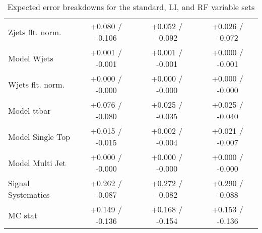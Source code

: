 \begin{enumeate}
\begin{table}[!htbp]
\begin{center}
\begin{tabular}{lccc}
Zjets flt. norm. &  +0.080 / -0.106  &  +0.052 / -0.092  &  +0.026 / -0.072 \\
Model Wjets &  +0.001 / -0.001  &  +0.001 / -0.001  &  +0.000 / -0.001 \\
Wjets flt. norm. &  +0.000 / -0.000  &  +0.000 / -0.000  &  +0.000 / -0.000 \\
Model ttbar &  +0.076 / -0.080  &  +0.025 / -0.035  &  +0.025 / -0.040 \\
Model Single Top &  +0.015 / -0.015  &  +0.002 / -0.004  &  +0.021 / -0.007 \\
Model Multi Jet &  +0.000 / -0.000  &  +0.000 / -0.000  &  +0.000 / -0.000 \\
Signal Systematics &  +0.262 / -0.087  &  +0.272 / -0.082  &  +0.290 / -0.088 \\
MC stat &  +0.149 / -0.136  &  +0.168 / -0.154  &  +0.153 / -0.136 \\
\hline\hline
\end{tabular}
\end{center}
\caption{Expected error breakdowns for the standard, LI, and RF variable sets}
\label{tab:breakdownexp}
\end{table}


\end{enumeate}

